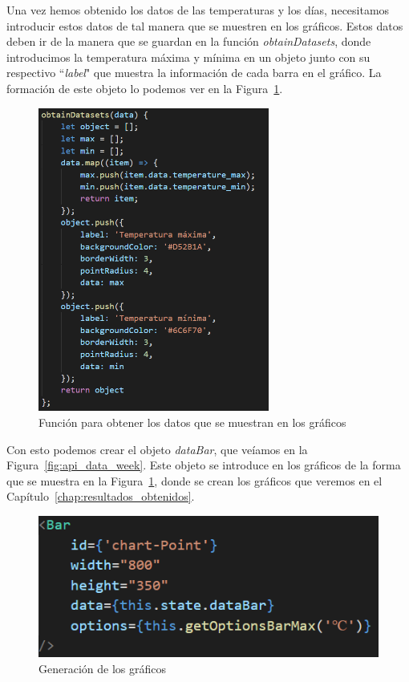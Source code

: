 \documentclass[a4paper, 12pt]{book}
\begin{document}
\vspace{5mm}
Una vez hemos obtenido los datos de las temperaturas y los días, necesitamos introducir estos datos de tal manera que se muestren en los gráficos. Estos datos deben ir de la manera que se guardan en la función \textit{obtainDatasets}, donde introducimos la temperatura máxima y mínima en un objeto junto con su respectivo ``\textit{label}"  que muestra la información de cada barra en el gráfico. La formación de este objeto lo podemos ver en la Figura~\ref{fig:obtain_datasets}.
\begin{figure}[h]
  \centering
  \includegraphics[height=10cm]{img_usadas/obtain_datasets.png}
  \caption{Función para obtener los datos que se muestran en los gráficos}
  \label{fig:obtain_datasets}
\end{figure}

\vspace{5mm}
Con esto podemos crear el objeto \textit{dataBar}, que veíamos en la Figura~\ref{fig:api_data_week}. Este objeto se introduce en los gráficos de la forma que se muestra en la Figura~\ref{fig:obtain_datasets}, donde se crean los gráficos que veremos en el Capítulo~\ref{chap:resultados_obtenidos}.
\begin{figure}[h]
  \centering
  \includegraphics{img_usadas/chart_data.png}
  \caption{Generación de los gráficos}
  \label{fig:chart_data}
\end{figure}
\end{document}
